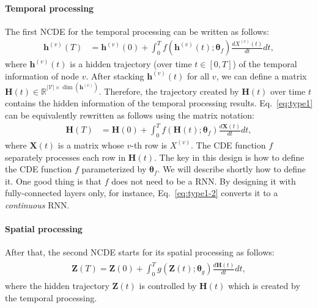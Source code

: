 \documentclass[letterpaper]{article} \usepackage{aaai22}  \usepackage{times}  \usepackage{helvet}  \usepackage{courier}  \usepackage[hyphens]{url}  \usepackage{graphicx} \urlstyle{rm} \def\UrlFont{\rm}  \usepackage{natbib}  \usepackage{caption} \DeclareCaptionStyle{ruled}{labelfont=normalfont,labelsep=colon,strut=off} \frenchspacing  \setlength{\pdfpagewidth}{8.5in}  \setlength{\pdfpageheight}{11in}  \usepackage{stfloats}
\begin{document}
\paragraph{Temporal processing} The first NCDE for the temporal processing can be written as follows:
\begin{align}
\bm{h}^{(v)}(T) &= \bm{h}^{(v)}(0) + \int_{0}^{T} f(\bm{h}^{(v)}(t);\bm{\theta}_f) \frac{dX^{(v)}(t)}{dt} dt, \label{eq:type1}
\end{align} where $\bm{h}^{(v)}(t)$ is a hidden trajectory (over time $t \in [0,T]$) of the temporal information of node $v$. After stacking $\bm{h}^{(v)}(t)$ for all $v$, we can define a matrix $\bm{H}(t) \in \mathbb{R}^{|\mathcal{V}| \times \dim(\bm{h}^{(v)})}$. Therefore, the trajectory created by $\bm{H}(t)$ over time $t$ contains the hidden information of the temporal processing results. Eq.~\eqref{eq:type1} can be equivalently rewritten as follows using the matrix notation:
\begin{align}
\bm{H}(T) &= \bm{H}(0) + \int_{0}^{T} f(\bm{H}(t);\bm{\theta}_f) \frac{d\bm{X}(t)}{dt} dt, \label{eq:type1-2}
\end{align}where $\bm{X}(t)$ is a matrix whose $v$-th row is $X^{(v)}$. The CDE function $f$ separately processes each row in $\bm{H}(t)$. The key in this design is how to define the CDE function $f$ parameterized by $\bm{\theta}_f$. We will describe shortly how to define it. One good thing is that $f$ does not need to be a RNN. By designing it with fully-connected layers only, for instance, Eq.~\eqref{eq:type1-2} converts it to a \emph{continuous} RNN. 

\paragraph{Spatial processing} After that, the second NCDE starts for its spatial processing as follows:
\begin{align}\begin{split}
\bm{Z}(T) = \bm{Z}(0) + \int_{0}^{T} g(\bm{Z}(t);\bm{\theta}_g) \frac{d\bm{H}(t)}{dt} dt,\label{eq:type2}
\end{split}\end{align}where the hidden trajectory $\bm{Z}(t)$ is controlled by $\bm{H}(t)$ which is created by the temporal processing.
\end{document}
